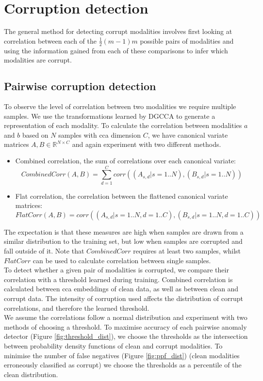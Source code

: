 \section{Corruption detection}
The general method for detecting corrupt modalities involves first looking at correlation between each of the $\frac{1}{2}(m-1)m$ possible pairs of modalities and using the information gained from each of these comparisons to infer which modalities are corrupt.

\subsection{Pairwise corruption detection}
To observe the level of correlation between two modalities we require multiple samples. We use the transformations learned by DGCCA to generate a representation of each modality. To calculate the correlation between modalities $a$ and $b$ based on $N$ samples with cca dimension $C$, we have canonical variate matrices $A, B \in \mathbb{R}^{N\times C}$ and again experiment with two different methods. 
\begin{itemize}
    \item Combined correlation, the sum of correlations over each canonical variate:
$$CombinedCorr(A, B) = \sum_{d=1}^C{corr((A_{s,d} | s=1..N), (B_{s,d} | s=1..N))}$$
    \item Flat correlation, the correlation between the flattened canonical variate matrices:
$$FlatCorr(A, B) = corr((A_{s,d} | s=1..N, d=1..C), (B_{s,d} | s=1..N, d=1..C))$$
\end{itemize}

The expectation is that these measures are high when samples are drawn from a similar distribution to the training set, but low when samples are corrupted and fall outside of it. Note that $CombinedCorr$ requires at least two samples, whilst $FlatCorr$ can be used to calculate correlation between single samples.\\

To detect whether a given pair of modalities is corrupted, we compare their correlation with a threshold learned during training. Combined correlation is calculated between cca embeddings of clean data, as well as between clean and corrupt data. The intensity of corruption used affects the distribution of corrupt correlations, and therefore the learned threshold.\\

We assume the correlations follow a normal distribution and experiment with two methods of choosing a threshold. To maximise accuracy of each pairwise anomaly detector (Figure \ref{fig:threshold_dist}), we choose the thresholds as the intersection between probability density functions of clean and corrupt modalities. To minimise the number of false negatives (Figure \ref{fig:ppf_dist}) (clean modalities erroneously classified as corrupt) we choose the thresholds as a percentile of the clean distribution.

